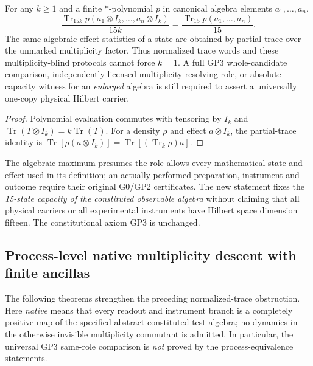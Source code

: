 \documentclass[12pt,a4paper]{article}
\begin{document}
\begin{proposition}
\label{p2b:prop:v352-normalized-amplification}
For any $k\geq1$ and a finite $*$-polynomial $p$ in canonical
algebra elements $a_1,\ldots,a_n$,
\[
 \boxed{\frac{\operatorname{Tr}_{15k}
   p(a_1\otimes I_k,\ldots,a_n\otimes I_k)}{15k}
 =\frac{\operatorname{Tr}_{15}p(a_1,\ldots,a_n)}{15}.}
\]
The same algebraic effect statistics of a state are obtained by
partial trace over the unmarked multiplicity factor.  Thus normalized
trace words and these multiplicity-blind protocols cannot force
$k=1$.  A full GP3 whole-candidate comparison, independently
licensed multiplicity-resolving role, or absolute capacity witness
for an \emph{enlarged} algebra is still required to assert a
universally one-copy physical Hilbert carrier.
\end{proposition}
\begin{proof}
Polynomial evaluation commutes with tensoring by $I_k$ and
$\operatorname{Tr}(T\otimes I_k)=k\operatorname{Tr}(T)$.
For a density $\rho$ and effect $a\otimes I_k$, the partial-trace
identity is $\operatorname{Tr}[\rho(a\otimes I_k)]
=\operatorname{Tr}[(\operatorname{Tr}_k\rho)a]$.
\end{proof}

\begin{remark}
\label{p2b:rem:v352-capacity-occurrence}
The algebraic maximum presumes the role allows every mathematical
state and effect used in its definition; an actually performed
preparation, instrument and outcome require their original G0/GP2
certificates.  The new statement fixes the \emph{15-state capacity
of the constituted observable algebra} without claiming that all
physical carriers or all experimental instruments have Hilbert
space dimension fifteen.  The constitutional axiom GP3 is unchanged.
\end{remark}


\subsection{Process-level native multiplicity descent with finite ancillas}
\label{p2b:sec:v355-native-multitime}
The following theorems strengthen the preceding normalized-trace
obstruction. Here \emph{native} means that every readout and instrument
branch is a completely positive map of the specified abstract constituted
test algebra; no dynamics in the otherwise invisible multiplicity commutant
is admitted. In particular, the universal GP3 same-role comparison is \emph{not}
proved by the process-equivalence statements.
\end{document}
